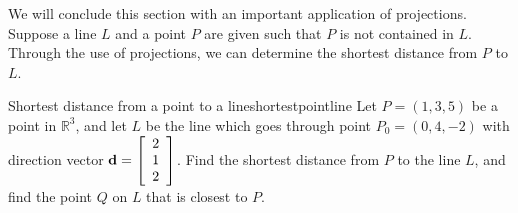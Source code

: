 We will conclude this section with an important application of projections. Suppose a line $L$ and a point $P$ are given such that $P$ is not contained in $L$. Through the use of projections, we can determine the shortest distance from $P$ to $L$. 

\begin{example}{Shortest distance from a point to a line}{shortestpointline}
Let $P = (1,3,5)$ be a point in $\mathbb{R}^3$, and let $L$ be the line which goes through point $P_0 = (0,4,-2)$ with direction vector ${\bf d} = \left[
\begin{array}{r}
2 \\
1 \\
2
\end{array}
\right]
$.  Find the shortest distance from $P$ to the line $L$, and find the point $Q$ on $L$ that is closest to $P$. 
\end{example}

